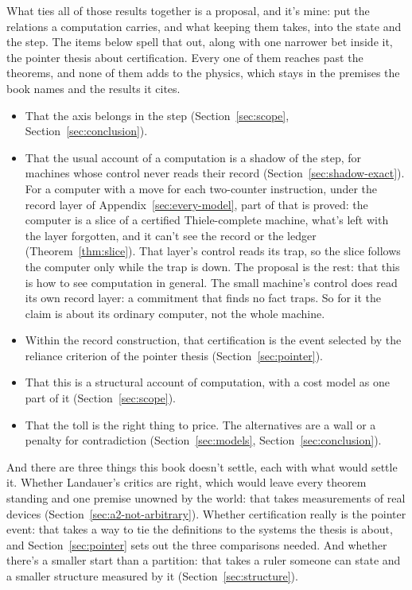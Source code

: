 \documentclass[11pt,twoside]{article}
\theoremstyle{thielethm}
\theoremstyle{thieledef}
\theoremstyle{thieledef}
\theoremstyle{thieledef}
\theoremstyle{thielethm}
\theoremstyle{thieleobs}
\theoremstyle{thielethm}
\begin{document}
What ties all of those results together is a proposal, and it's mine: put the relations a
computation carries, and what keeping them takes, into the state and the step. The items below
spell that out, along with one narrower bet inside it, the pointer thesis about
certification. Every one of them reaches past the theorems, and none of them adds to the
physics, which stays in the premises the book names and the results it cites.

\begin{itemize}
\item That the axis belongs in the step (Section~\ref{sec:scope}, Section~\ref{sec:conclusion}).
\item That the usual account of a computation is a shadow of the step, for machines whose control never reads their record (Section~\ref{sec:shadow-exact}). For a computer with a move for each two-counter instruction, under the record layer of Appendix~\ref{sec:every-model}, part of that is proved: the computer is a slice of a certified Thiele-complete machine, what's left with the layer forgotten, and it can't see the record or the ledger (Theorem~\ref{thm:slice}). That layer's control reads its trap, so the slice follows the computer only while the trap is down. The proposal is the rest: that this is how to see computation in general. The small machine's control does read its own record layer: a commitment that finds no fact traps. So for it the claim is about its ordinary computer, not the whole machine.
\item Within the record construction, that certification is the event selected by the reliance criterion of the pointer thesis (Section~\ref{sec:pointer}).
\item That this is a structural account of computation, with a cost model as one part of it (Section~\ref{sec:scope}).
\item That the toll is the right thing to price. The alternatives are a wall or a penalty for contradiction (Section~\ref{sec:models}, Section~\ref{sec:conclusion}).
\end{itemize}

And there are three things this book doesn't settle, each with what would settle it. Whether Landauer's critics are
right, which would leave every theorem standing and one premise unowned by the world: that takes
measurements of real devices (Section~\ref{sec:a2-not-arbitrary}). Whether certification really is the
pointer event: that takes a way to tie the definitions to the systems the thesis is about, and Section~\ref{sec:pointer}
sets out the three comparisons needed. And whether there's a smaller start than a partition: that takes a ruler
someone can state and a smaller structure measured by it (Section~\ref{sec:structure}).
\end{document}

